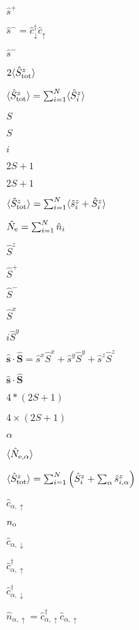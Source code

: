 \documentclass{article}
\begin{document}
$ \hat{s}^{+}$
\pagebreak

$ \hat{s}^{-}=\hat{c}^{\dagger}_{\downarrow}\hat{c}_{\uparrow}$
\pagebreak

$ \hat{s}^{-}$
\pagebreak

$ 2\langle\hat{S}^{z}_{\rm tot}\rangle$
\pagebreak

$ \langle\hat{S}^{z}_{\rm tot}\rangle=\sum^{N}_{i=1}\langle\hat{S}^{z}_{i}\rangle $
\pagebreak

$ S $
\pagebreak

$ S$
\pagebreak

$ i$
\pagebreak

$ 2S+1$
\pagebreak

$ 2S + 1$
\pagebreak

$ \langle\hat{S}^{z}_{\rm tot}\rangle=\sum^{N}_{i=1}\langle\hat{s}^{z}_{i}+\hat{S}^{z}_{i}\rangle $
\pagebreak

$ \hat{N}_{\rm e}=\sum^{N}_{i=1}\hat{n}_{i} $
\pagebreak

$ \hat{S}^{z}$
\pagebreak

$ \hat{S}^{+}$
\pagebreak

$ \hat{S}^{-}$
\pagebreak

$ \hat{S}^{x}$
\pagebreak

$ i\hat{S}^{y}$
\pagebreak

$ \hat{\boldsymbol{s}}\cdot\hat{\boldsymbol{S}}=\hat{s}^{x}\hat{S}^{x}+\hat{s}^{y}\hat{S}^{y}+\hat{s}^{z}\hat{S}^{z}$
\pagebreak

$ \hat{\boldsymbol{s}}\cdot\hat{\boldsymbol{S}}$
\pagebreak

$ 4*(2S+1)$
\pagebreak

$ 4\times (2S + 1) $
\pagebreak

$ \alpha $
\pagebreak

$ \langle\hat{N}_{{\rm e}, \alpha}\rangle$
\pagebreak

$ \langle\hat{S}^{z}_{\rm tot}\rangle = \sum^{N}_{i=1}\left(\hat{S}^{z}_{i} + \sum_{\alpha}\hat{s}^{z}_{i,\alpha}\right)$
\pagebreak

$ \hat{c}_{\alpha, \uparrow}$
\pagebreak

$ n_{\rm o}$
\pagebreak

$ \hat{c}_{\alpha, \downarrow}$
\pagebreak

$ \hat{c}^{\dagger}_{\alpha, \uparrow}$
\pagebreak

$ \hat{c}^{\dagger}_{\alpha, \downarrow}$
\pagebreak

$ \hat{n}_{\alpha, \uparrow}=\hat{c}^{\dagger}_{\alpha, \uparrow}\hat{c}_{\alpha, \uparrow}$
\pagebreak
\end{document}
